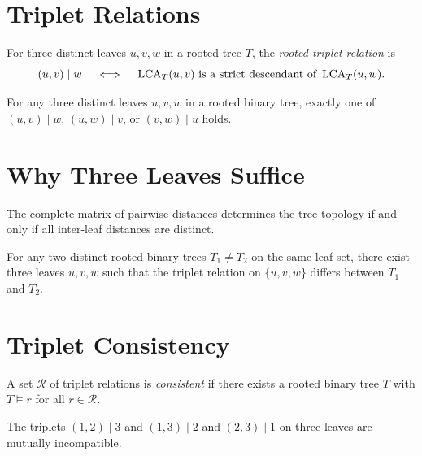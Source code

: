 \section{Triplet Relations}

\begin{definition}
For three distinct leaves $u, v, w$ in a rooted tree $T$, the \emph{rooted triplet relation} is
\[
(u,v) \mid w \quad \iff \quad \operatorname{LCA}_T(u,v) \text{ is a strict descendant of } \operatorname{LCA}_T(u,w).
\]
\end{definition}

\begin{proposition}[Trichotomy]
For any three distinct leaves $u, v, w$ in a rooted binary tree, exactly one of $(u,v)\mid w$, $(u,w)\mid v$, or $(v,w)\mid u$ holds.
\end{proposition}

\section{Why Three Leaves Suffice}

\begin{proposition}
The complete matrix of pairwise distances determines the tree topology if and only if all inter-leaf distances are distinct.
\end{proposition}

\begin{proposition}
For any two distinct rooted binary trees $T_1 \neq T_2$ on the same leaf set, there exist three leaves $u,v,w$ such that the triplet relation on $\{u,v,w\}$ differs between $T_1$ and $T_2$.
\end{proposition}

\section{Triplet Consistency}

\begin{definition}
A set $\mathcal{R}$ of triplet relations is \emph{consistent} if there exists a rooted binary tree $T$ with $T \models r$ for all $r \in \mathcal{R}$.
\end{definition}

\begin{proposition}
The triplets $(1,2)\mid 3$ and $(1,3)\mid 2$ and $(2,3)\mid 1$ on three leaves are mutually incompatible.
\end{proposition}

